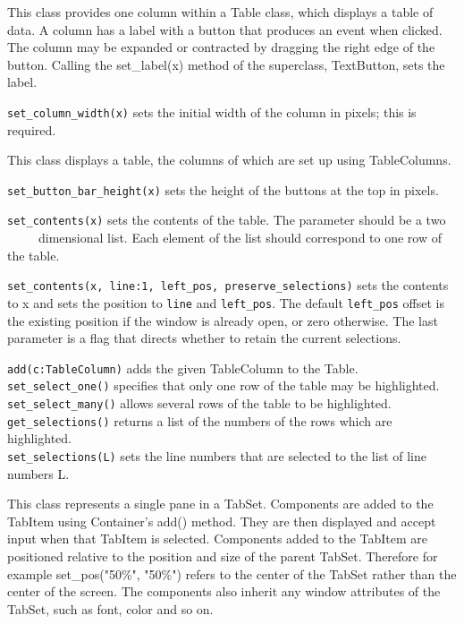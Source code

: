 This class provides one column within a Table class, which displays a
table of data. A column has a label with a button that produces an
event when clicked. The column may be expanded or contracted by
dragging the right edge of the button. Calling the set\_label(x) method
of the superclass, TextButton, sets the label.

\texttt{set\_column\_width(x)} sets the initial width of the column in pixels;
this is required.



This class displays a table, the columns of which are set up using
TableColumns.

\texttt{set\_button\_bar\_height(x)} sets the height of the buttons at the top
in pixels.

\texttt{set\_contents(x)} sets the contents of the table. The parameter should be
a two\\
 \ \ \ \ \ dimensional list. Each element of the list should correspond
to one row of the table.

\texttt{set\_contents(x, line:1, left\_pos, preserve\_selections)} sets the
contents to x and sets the position to \texttt{line} and
\texttt{left\_pos}. The default \texttt{left\_pos} offset is
the existing position if the window is already open, or zero
otherwise. The
last parameter is a flag that directs whether to retain the current selections.


\texttt{add(c:TableColumn)} adds the given TableColumn to the Table.\\
\texttt{set\_select\_one()} specifies that only one row of the table may be
highlighted.\\
\texttt{set\_select\_many()} allows several rows of the table to be
highlighted.\\
\texttt{get\_selections()} returns a list of the numbers of the rows which are
highlighted.\\
\texttt{set\_selections(L)} sets the line numbers that are selected to the
list of line numbers L.


This class represents a single pane in a TabSet. Components are added to
the TabItem using Container's add() method. They are
then displayed and accept input when that TabItem is selected.
Components added to the TabItem are positioned relative to the position
and size of the parent TabSet. Therefore for example
set\_pos("50\%",
"50\%") refers to the center of the TabSet
rather than the center of the screen. The components also inherit any
window attributes of the TabSet, such as font, color and so on.

